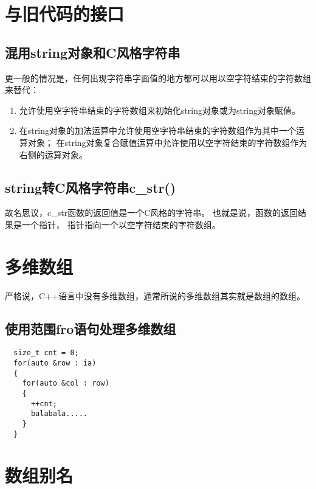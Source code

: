\section{与旧代码的接口}
\subsection{混用string对象和C风格字符串}
更一般的情况是，任何出现字符串字面值的地方都可以用以空字符结束的字符数组来替代：
\begin{enumerate}
\item{允许使用空字符串结束的字符数组来初始化string对象或为string对象赋值。%
  }
\item{在string对象的加法运算中允许使用空字符串结束的字符数组作为其中一个运算对象；%
  在string对象复合赋值运算中允许使用以空字符结束的字符数组作为右侧的运算对象。}
\end{enumerate}
\subsection{string转C风格字符串c\_str()}
故名思议，c\_str函数的返回值是一个C风格的字符串。%
也就是说，函数的返回结果是一个指针，%
指针指向一个以空字符结束的字符数组。%
\section{多维数组}
严格说，C++语言中没有多维数组，通常所说的多维数组其实就是数组的数组。
\subsection{使用范围fro语句处理多维数组}
\begin{lstlisting}
  size_t cnt = 0;
  for(auto &row : ia)
  {
    for(auto &col : row)
    {
      ++cnt;
      balabala.....
    }
  }
\end{lstlisting}

\section{数组别名}












